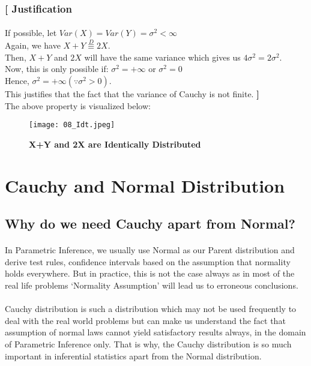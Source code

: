 \documentclass[12pt, fleqn, a4paper]{article}
\begin{document}
\begin{itemize}
	\subsubsection*{[ Justification}
	\paragraph{} If possible, let \(Var(X)=Var(Y)=\sigma^2< \infty\) \\ Again, we have \(X+Y\stackrel{D}{\equiv}2X\).
	\\ Then, \(X+Y\) and \(2X\) will have the same variance which gives us \(4\sigma^2=2\sigma^2\). \\ Now, this is only possible if: \(\sigma^2=+\infty\) or \(\sigma^2=0\) \\
	Hence, \(\sigma^2=+\infty\)\qquad \((\because\sigma^2>0)\). \\ This justifies that the fact that the variance of Cauchy is not finite. \textbf{]} \\
	The above property is visualized below: 
	\begin{figure}[H] \centering
		\texttt{[image: 08\_Idt.jpeg]}
		\caption{\textbf{X+Y and 2X are Identically Distributed}}
	\end{figure}
	\end{itemize}
	
	\newpage
	\section{Cauchy and Normal Distribution}
	\subsection{Why do we need Cauchy apart from Normal?}
	\paragraph{} In Parametric Inference, we usually use Normal as our Parent distribution and derive test rules, confidence intervals based on the assumption that normality holds everywhere. But in practice, this is not the case always as in most of the real life problems `Normality Assumption' will lead us to erroneous conclusions. 
	\paragraph{} Cauchy distribution is such a distribution which may not be used frequently to deal with the real world problems but can make us understand the fact that assumption of normal laws cannot yield satisfactory results always, in the domain of Parametric Inference only. That is why, the Cauchy distribution is so much important in inferential statistics apart from the Normal distribution. 
	
\end{document}
